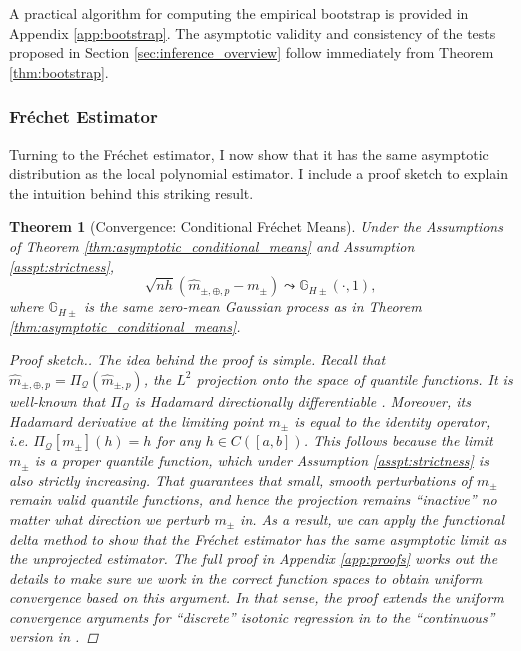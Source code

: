 \documentclass[12pt]{article}
\newtheorem{theorem}{Theorem}
\begin{document}
A practical algorithm for computing the empirical bootstrap is provided in Appendix \ref{app:bootstrap}. The asymptotic validity and consistency of the tests proposed in Section \ref{sec:inference_overview} follow immediately from Theorem \ref{thm:bootstrap}.

\subsubsection{Fr\'echet Estimator}

Turning to the Fr\'echet estimator, I now show that it has the same asymptotic distribution as the local polynomial estimator. I include a proof sketch to explain the intuition behind this striking result. 

\begin{theorem}[Convergence: Conditional Fr\'echet Means] \label{thm:convergence_frechet}
Under the Assumptions of Theorem \ref{thm:asymptotic_conditional_means} and Assumption \ref{asspt:strictness}, 
\[ \sqrt{n h}
\left( \hat{m}_{ \pm, \oplus, p} -  m_{\pm}\right) \leadsto  \mathbb{G}_{H \pm}(\cdot, 1),
\]
where $\mathbb{G}_{H \pm}$ is the \emph{same} zero-mean Gaussian process as in Theorem \ref{thm:asymptotic_conditional_means}.
\begin{proof}[Proof sketch.] The idea behind the proof is simple. Recall that $\hat{m}_{\pm, \oplus, p} = \Pi_{\mathcal{Q}}(\hat{m}_{\pm,p})$, the $L^2$ projection onto the space of quantile functions. It is well-known that $\Pi_{\mathcal{Q}}$ is Hadamard directionally differentiable \citep{zarantonello1971projections}. Moreover, its Hadamard derivative at the limiting point $m_{\pm}$ is equal to the identity operator, i.e. $\Pi_{\mathcal{Q}}[m_\pm](h)=h$ for any $h \in C([a,b])$. This follows because the limit $m_{\pm}$ is a proper quantile function, which under Assumption \ref{asspt:strictness} is also strictly increasing. That guarantees that small, smooth perturbations of $m_{\pm}$ remain valid quantile functions, and hence the projection remains ``inactive'' no matter what direction we perturb $m_{\pm}$ in. As a result, we can apply the functional delta method \citep[Theorem 20.8]{van2000asymptotic} to show that the Fr\'echet estimator has the same asymptotic limit as the unprojected estimator. The full proof in Appendix \ref{app:proofs} works out the details to make sure we work in the correct function spaces to obtain uniform convergence based on this argument. In that sense, the proof extends the uniform convergence arguments for ``discrete'' isotonic regression in \citet{yang2019contraction} to the ``continuous'' version in \citet{groeneboom2010generalized}.
\end{proof}
\end{theorem}
\end{document}
